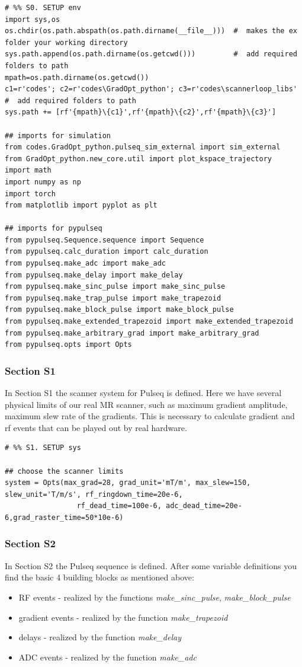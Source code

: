 \documentclass[a4paper,12pt]{extarticle}
\begin{document}
\begin{verbatim}
# %% S0. SETUP env
import sys,os
os.chdir(os.path.abspath(os.path.dirname(__file__)))  #  makes the ex folder your working directory
sys.path.append(os.path.dirname(os.getcwd()))         #  add required folders to path
mpath=os.path.dirname(os.getcwd())
c1=r'codes'; c2=r'codes\GradOpt_python'; c3=r'codes\scannerloop_libs' #  add required folders to path
sys.path += [rf'{mpath}\{c1}',rf'{mpath}\{c2}',rf'{mpath}\{c3}']

## imports for simulation
from codes.GradOpt_python.pulseq_sim_external import sim_external
from GradOpt_python.new_core.util import plot_kspace_trajectory
import math
import numpy as np
import torch
from matplotlib import pyplot as plt

## imports for pypulseq
from pypulseq.Sequence.sequence import Sequence
from pypulseq.calc_duration import calc_duration
from pypulseq.make_adc import make_adc
from pypulseq.make_delay import make_delay
from pypulseq.make_sinc_pulse import make_sinc_pulse
from pypulseq.make_trap_pulse import make_trapezoid
from pypulseq.make_block_pulse import make_block_pulse
from pypulseq.make_extended_trapezoid import make_extended_trapezoid
from pypulseq.make_arbitrary_grad import make_arbitrary_grad
from pypulseq.opts import Opts
\end{verbatim}

\subsubsection{Section S1}
In Section S1 the scanner system for Pulseq is defined.
Here we have several physical limits of our real MR scanner, such as maximum gradient amplitude, maximum slew rate of the gradients. This is necessary to calculate gradient and rf events that can be played out by real hardware.

\begin{verbatim}
# %% S1. SETUP sys

## choose the scanner limits
system = Opts(max_grad=28, grad_unit='mT/m', max_slew=150, slew_unit='T/m/s', rf_ringdown_time=20e-6,
                 rf_dead_time=100e-6, adc_dead_time=20e-6,grad_raster_time=50*10e-6)
\end{verbatim}

\subsubsection{Section S2}
In Section S2 the Pulseq sequence is defined. After some variable definitions you find the basic 4 building blocks as mentioned above:
\begin{itemize}
\item RF events - realized by the functions \emph{make\_sinc\_pulse}, \emph{make\_block\_pulse}
\item gradient events - realized by the function \emph{make\_trapezoid}
\item delays - realized by the function \emph{make\_delay}
\item ADC events  - realized by the function \emph{make\_adc}
\end{itemize}
\end{document}
